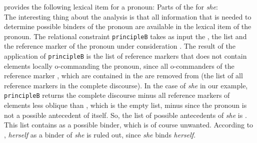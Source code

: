 \documentclass[output=paper
	        ,collection
	        ,collectionchapter
 	        ,biblatex
                ,babelshorthands
                ,newtxmath
                ,draftmode
                ,colorlinks, citecolor=brown
]{langscibook}
\begin{document}
\citet[]{Branco2002a} provides the following lexical item for a pronoun:
\eas
Parts of the \synsemv for \emph{she}:\\
\zs
The interesting thing about the analysis is that all information that is needed to determine
possible binders of the pronoun are available in the lexical item of the pronoun. The relational
constraint \texttt{principleB} takes as input the \listal {}, the \listu list  and the reference marker
of the pronoun under consideration . The result of the application of \texttt{principleB} is the list
of reference markers that does not contain elements locally o-commanding the pronoun, since all
o-commanders of the reference marker , which are contained in the \lista are removed from \listu (the
list of all reference markers in the complete discourse). In the case of \emph{she} in our example,
\texttt{principleB} returns the complete discourse  minus all reference markers of elements less oblique than , which is the empty
list, minus  since the pronoun is not a possible antecedent of itself. So, the list of
possible antecedents of \emph{she} is . This list
contains  as a possible binder, which is of course unwanted. According to
\citet[]{Branco2002a}, \emph{herself} as a binder of \emph{she} is ruled out, since
\emph{she} binds \emph{herself}.
\end{document}
